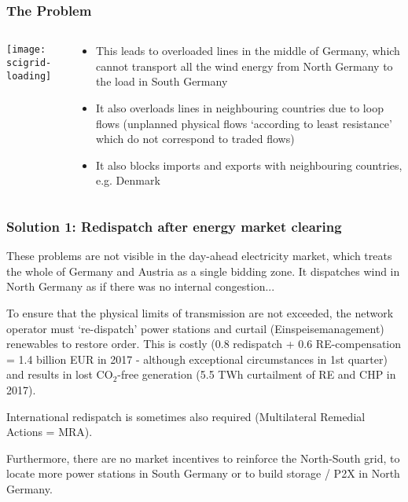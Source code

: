 \documentclass[10pt,aspectratio=169,dvipsnames]{beamer}
\let\olditem\item
\renewcommand{\item}{%
\olditem\vspace{5pt}}
\begin{document}
\begin{frame}
  \frametitle{The Problem}



\begin{columns}[T]
  \begin{column}{5.5cm}
        \vspace{.5cm}
\texttt{[image: scigrid-loading]}
  \end{column}

  \begin{column}{6cm}
    \begin{itemize}
      \item This leads to \alert{overloaded lines} in the middle of Germany, which
   cannot transport all the wind energy from North Germany to the load
   in South Germany

   \item It also overloads lines in neighbouring countries due to
     \alert{loop flows} (unplanned physical flows `according to least
     resistance' which do not correspond to traded flows)

     \item It also \alert{blocks imports and exports} with
       neighbouring countries, e.g. Denmark

    \end{itemize}

\end{column}
\end{columns}

\end{frame}

\begin{frame}
  \frametitle{Solution 1: Redispatch after energy market clearing}

  These problems are \alert{not visible} in the day-ahead electricity
  market, which treats the whole of Germany and Austria as a single
  bidding zone. It dispatches wind in North Germany as if there was no
  internal congestion...

  To ensure that the physical limits of transmission are not exceeded,
  the network operator must \alert{`re-dispatch'} power stations and
  \alert{curtail} (Einspeisemanagement) renewables to restore order.
  This is \alert{costly} (0.8 redispatch + 0.6 RE-compensation = 1.4 billion
  EUR in 2017 - although exceptional circumstances in 1st quarter) and
  results in \alert{lost CO$_2$-free generation} (5.5 TWh curtailment of RE
  and CHP in 2017).

  \alert{International redispatch} is sometimes also required
  (Multilateral Remedial Actions = MRA).

  Furthermore, there are \alert{no market incentives} to reinforce the North-South
  grid, to locate more power stations in South Germany or to
  build storage / P2X in North Germany.

\end{frame}
\end{document}
